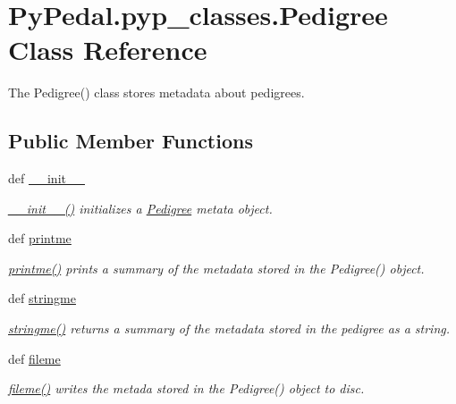 \hypertarget{classPyPedal_1_1pyp__classes_1_1Pedigree}{
\section{PyPedal.pyp\_\-classes.Pedigree Class Reference}
\label{classPyPedal_1_1pyp__classes_1_1Pedigree}
}


The Pedigree() class stores metadata about pedigrees.  


\subsection*{Public Member Functions}
\begin{DoxyCompactItemize}
\item 
def \hyperlink{classPyPedal_1_1pyp__classes_1_1Pedigree_ade39878cc44e604f0d2f1023a9014518}{\_\-\_\-init\_\-\_\-}
\begin{DoxyCompactList}\small\item\em \hyperlink{classPyPedal_1_1pyp__classes_1_1Pedigree_ade39878cc44e604f0d2f1023a9014518}{\_\-\_\-init\_\-\_\-()} initializes a \hyperlink{classPyPedal_1_1pyp__classes_1_1Pedigree}{Pedigree} metata object. \end{DoxyCompactList}\item 
def \hyperlink{classPyPedal_1_1pyp__classes_1_1Pedigree_ab8c2b67da1b07fedf79d997172b72a03}{printme}
\begin{DoxyCompactList}\small\item\em \hyperlink{classPyPedal_1_1pyp__classes_1_1Pedigree_ab8c2b67da1b07fedf79d997172b72a03}{printme()} prints a summary of the metadata stored in the Pedigree() object. \end{DoxyCompactList}\item 
def \hyperlink{classPyPedal_1_1pyp__classes_1_1Pedigree_ac4a0cad61344517ea9a1b00b6f1ee007}{stringme}
\begin{DoxyCompactList}\small\item\em \hyperlink{classPyPedal_1_1pyp__classes_1_1Pedigree_ac4a0cad61344517ea9a1b00b6f1ee007}{stringme()} returns a summary of the metadata stored in the pedigree as a string. \end{DoxyCompactList}\item 
def \hyperlink{classPyPedal_1_1pyp__classes_1_1Pedigree_a009aa82eb9e76635475f092c269a719f}{fileme}
\begin{DoxyCompactList}\small\item\em \hyperlink{classPyPedal_1_1pyp__classes_1_1Pedigree_a009aa82eb9e76635475f092c269a719f}{fileme()} writes the metada stored in the Pedigree() object to disc. \end{DoxyCompactList}\item 

\end{DoxyCompactItemize}
